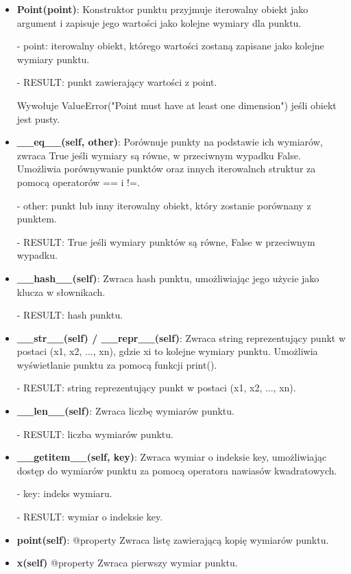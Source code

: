 \documentclass{lab}
\begin{document}
\begin{itemize}
    \item \textbf{Point(point)}: 
    Konstruktor punktu przyjmuje iterowalny obiekt jako argument i zapisuje jego wartości jako kolejne wymiary dla punktu.

    - point: iterowalny obiekt, którego wartości zostaną zapisane jako kolejne wymiary punktu.

    - RESULT: punkt zawierający wartości z point.
    
    Wywołuje ValueError("Point must have at least one dimension") jeśli obiekt jest pusty.
    \item \textbf{\_\_eq\_\_(self, other)}:
    Porównuje punkty na podstawie ich wymiarów, zwraca True jeśli wymiary są równe, w przeciwnym wypadku False. Umożliwia porównywanie punktów oraz innych iterowalnch struktur za pomocą operatorów == i !=.

    - other: punkt lub inny iterowalny obiekt, który zostanie porównany z punktem.

    - RESULT: True jeśli wymiary punktów są równe, False w przeciwnym wypadku.
    \item \textbf{\_\_hash\_\_(self)}:
    Zwraca hash punktu, umożliwiając jego użycie jako klucza w słownikach.

    - RESULT: hash punktu.
    \item \textbf{\_\_str\_\_(self) / \_\_repr\_\_(self)}:
    Zwraca string reprezentujący punkt w postaci (x1, x2, ..., xn), gdzie xi to kolejne wymiary punktu. Umożliwia wyświetlanie punktu za pomocą funkcji print().

    - RESULT: string reprezentujący punkt w postaci (x1, x2, ..., xn).

    \item \textbf{\_\_len\_\_(self)}:
    Zwraca liczbę wymiarów punktu.

    - RESULT: liczba wymiarów punktu.

    \item \textbf{\_\_getitem\_\_(self, key)}:
    Zwraca wymiar o indeksie key, umożliwiając dostęp do wymiarów punktu za pomocą operatora nawiasów kwadratowych.

    - key: indeks wymiaru.

    - RESULT: wymiar o indeksie key.
    \item \textbf{point(self)}:
    @property Zwraca listę zawierającą kopię wymiarów punktu.

    \item \textbf{x(self)}
    @property Zwraca pierwszy wymiar punktu.


\end{itemize}
\end{document}
